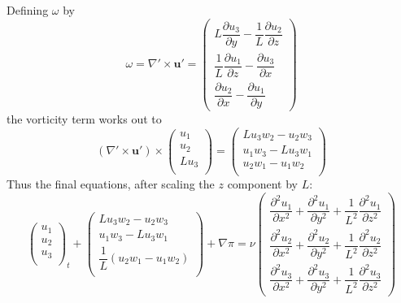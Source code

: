 \documentclass[12pt]{article}
\newcommand{\up}{\mathbf u'}
\newcommand{\grad}{\nabla}
\newcommand{\curlp}{\gradp \times}
\newcommand{\gradp}{\nabla'}
\begin{document}
Defining $\omega$ by  
\begin{equation}
\label{E:vor}
\omega = \curlp \up = 
\begin{pmatrix}
L \dfrac{\partial u_3}{\partial y} - \dfrac{1}{L} \dfrac{\partial u_2}{\partial z}  \\[5mm]
\dfrac{1}{L} \dfrac{\partial u_1}{\partial z} -  \dfrac{\partial u_3}{\partial x}  \\[5mm]
\dfrac{\partial u_2}{\partial x} - \dfrac{\partial u_1}{\partial y}
\end{pmatrix}  
\end{equation}
the vorticity term works out to 
\[
(\curlp \up) \times 
\begin{pmatrix} u_1 \\
                u_2 \\
                L u_3 \\
\end{pmatrix} = 
\begin{pmatrix} L u_3 w_2 - u_2 w_3 \\
                u_1 w_3 - L u_3 w_1 \\
                u_2 w_1 - u_1 w_2 \\
\end{pmatrix}  
\]
Thus the final equations, after scaling the $z$ component by $L$:
\[
\begin{pmatrix} u_1 \\
                u_2 \\
                u_3 \\
\end{pmatrix}_t
  + 
\begin{pmatrix} L u_3 w_2 - u_2 w_3 \\
                u_1 w_3 - L u_3 w_1 \\
                \dfrac{1}{L} (u_2 w_1 - u_1 w_2) \\
\end{pmatrix}  
+ \grad \pi = \nu 
\begin{pmatrix} \dfrac{\partial^2 u_1}{\partial x^2} + 
                \dfrac{\partial^2 u_1}{\partial y^2} + 
                \dfrac{1}{L^2}\dfrac{\partial^2 u_1}{\partial z^2}   \\[5mm]
                \dfrac{\partial^2 u_2}{\partial x^2} + 
                \dfrac{\partial^2 u_2}{\partial y^2} + 
                \dfrac{1}{L^2}\dfrac{\partial^2 u_2}{\partial z^2}   \\[5mm]
                \dfrac{\partial^2 u_3}{\partial x^2} + 
                \dfrac{\partial^2 u_3}{\partial y^2} + 
                \dfrac{1}{L^2}\dfrac{\partial^2 u_3}{\partial z^2}
\end{pmatrix}
\]
\end{document}
